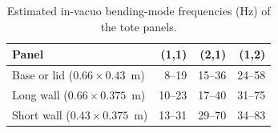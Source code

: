 \begin{table}[htbp]
  \centering
  \caption{Estimated in-vacuo bending-mode frequencies (Hz) of the tote panels.}
  \label{tab:tote_modes}
  \small
  \begin{tabular}{lrrr}
  \toprule
  Panel & (1,1) & (2,1) & (1,2) \\
  \midrule
  Base or lid ($0.66 \times 0.43$~m) & 8--19 & 15--36 & 24--58 \\
  Long wall ($0.66 \times 0.375$~m) & 10--23 & 17--40 & 31--75 \\
  Short wall ($0.43 \times 0.375$~m) & 13--31 & 29--70 & 34--83 \\
  \bottomrule
  \end{tabular}
\end{table}
